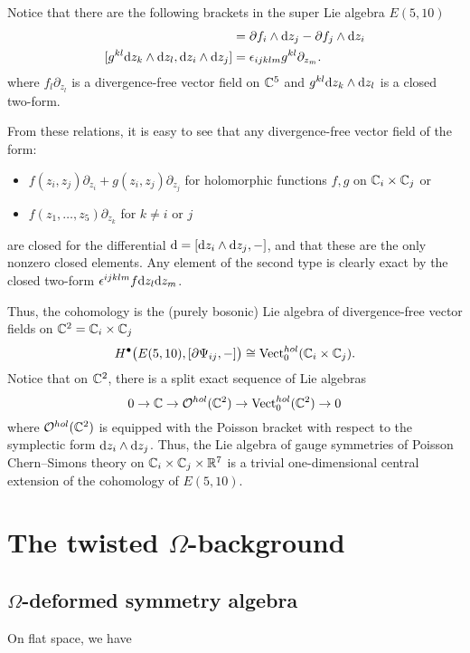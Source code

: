 \documentclass[11pt]{amsart}
\begin{document}
Notice that there are the following brackets in the super Lie algebra $E(5,10)$ 
\begin{align*}
[f_l \partial_{z_l} , \d z_i \wedge \d z_j] & = \del f_i \wedge \d z_j - \del f_j \wedge \d z_i \\
[g^{kl} \d z_k \wedge \d z_l , \d z_i \wedge \d z_j ] & = \ep_{ijklm} g^{kl} \partial_{z_m} .
\end{align*}
where $f_l \partial_{z_l}$ is a divergence-free vector field on $\mathbb C^5$ and $g^{kl} {\rm d} z_k \wedge {\rm d} z_l$ is a closed two-form. 

From these relations, it is easy to see that any divergence-free vector field of the form:
\begin{itemize}
\item $f(z_i, z_j) \partial_{z_i} + g(z_i, z_j) \partial_{z_j}$ for holomorphic functions $f,g$ on $\mathbb C_i \times \mathbb C_j$ or 
\item $f(z_1,\ldots,z_5) \partial_{z_k}$ for $k \ne i$ or $j$
\end{itemize}
are closed for the differential ${\rm d} = [{\rm d} z_i \wedge {\rm d} z_j  , -]$, and that these are the only nonzero closed elements. 
Any element of the second type is clearly exact by the closed two-form $\epsilon^{ijklm} f {\rm d} z_l {\rm d} z_m$. 

Thus, the cohomology is the (purely bosonic) Lie algebra of divergence-free vector fields on $\mathbb C^2 = \mathbb C_i \times \mathbb C_j$
\[
H^\bullet\big(E(5,10), [\partial \Psi_{ij}, -] \big) \cong {\rm Vect}^{hol}_0(\mathbb C_i \times \mathbb C_j) .
\]
Notice that on $\mathbb C^2$, there is a split exact sequence of Lie algebras
\[
0 \to \mathbb C \to \mathcal O^{hol}(\mathbb C^2) \to {\rm Vect}_0^{hol} (\mathbb C^2) \to 0
\]
where $\mathcal O^{hol}(\mathbb C^2)$ is equipped with the Poisson bracket with respect to the symplectic form ${\rm d} z_i \wedge {\rm d} z_j$.
Thus, the Lie algebra of gauge symmetries of Poisson Chern--Simons theory on $\mathbb C_i \times \mathbb C_j \times \mathbb R^7$ is a trivial one-dimensional central extension of the cohomology of $E(5,10)$. 

\section{The twisted $\Omega$-background} 

\subsection{$\Omega$-deformed symmetry algebra}

On flat space, we have 
\end{document}
